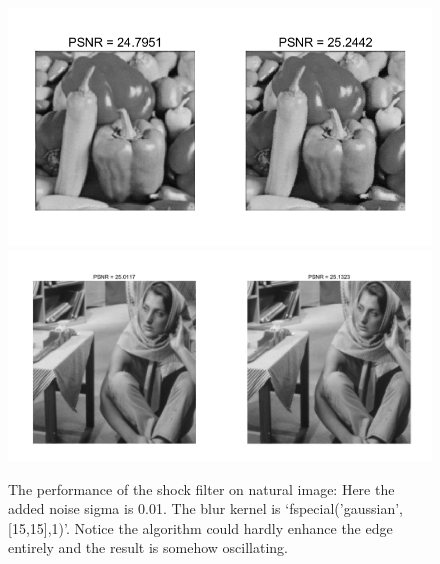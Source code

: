 \documentclass{article}
\begin{document}
\begin{figure}[H]
\begin{center}
\includegraphics[scale=.7]{9.png}
\includegraphics[scale=.3]{10.png}
\end{center}
\caption{The performance of the shock filter on natural image: Here the added noise sigma is 0.01. The blur kernel is `fspecial('gaussian', [15,15],1)'. Notice the algorithm could hardly enhance the edge entirely and the result is somehow oscillating.}
\end{figure}
\end{document}
